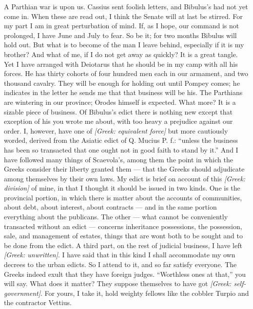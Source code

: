  A Parthian war is upon us. Cassius sent foolish letters, and Bibulus's had not yet come in. When these are read out, I think the Senate will at last be stirred. For my part I am in great perturbation of mind. If, as I hope, our command is not prolonged, I have June and July to fear. So be it; for two months Bibulus will hold out. But what is to become of the man I leave behind, especially if it is my brother? And what of me, if I do not get away as quickly? It is a great tangle. Yet I have arranged with Deiotarus that he should be in my camp with all his forces. He has thirty cohorts of four hundred men each in our armament, and two thousand cavalry. They will be enough for holding out until Pompey comes; he indicates in the letter he sends me that that business will be his. The Parthians are wintering in our province; Orodes himself is expected. What more? It is a sizable piece of business. Of Bibulus's edict there is nothing new except that exception of his you wrote me about, with too heavy a prejudice against our order. I, however, have one of \textit{[Greek: equivalent force]} but more cautiously worded, derived from the Asiatic edict of Q. Mucius P. f.: ``unless the business has been so transacted that one ought not in good faith to stand by it.'' And I have followed many things of Scaevola's, among them the point in which the Greeks consider their liberty granted them --- that the Greeks should adjudicate among themselves by their own laws. My edict is brief on account of this \textit{[Greek: division]} of mine, in that I thought it should be issued in two kinds. One is the provincial portion, in which there is matter about the accounts of communities, about debt, about interest, about contracts --- and in the same portion everything about the publicans. The other --- what cannot be conveniently transacted without an edict --- concerns inheritance possessions, the possession, sale, and management of estates, things that are wont both to be sought and to be done from the edict. A third part, on the rest of judicial business, I have left \textit{[Greek: unwritten]}. I have said that in this kind I shall accommodate my own decrees to the urban edicts. So I attend to it, and so far satisfy everyone. The Greeks indeed exult that they have foreign judges. ``Worthless ones at that,'' you will say. What does it matter? They suppose themselves to have got \textit{[Greek: self-government]}. For yours, I take it, hold weighty fellows like the cobbler Turpio and the contractor Vettius.

